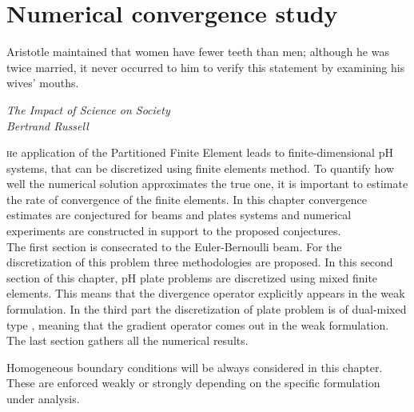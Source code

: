 \chapter{Numerical convergence study}\label{ch:conv}

\epigraph{Aristotle maintained that women have fewer teeth than men; although he was twice married, it never occurred to him to verify this statement by examining his wives' mouths.}{\textit{The Impact of Science on Society \\ Bertrand Russell}}

\minitoc

\lettrine{\color{theme}{T}}he application of the Partitioned Finite Element leads to finite-dimensional pH systems, that can be discretized using finite elements method. To quantify how well the numerical solution approximates the true one, it is important to estimate the rate of convergence of the finite elements. In this chapter convergence estimates are conjectured for beams and plates systems and numerical experiments are constructed in support to the proposed conjectures. \\

The first section is consecrated to the Euler-Bernoulli beam. For the discretization of this problem three methodologies are proposed. In this second section of this chapter, pH plate problems are discretized using mixed finite elements. This means that the divergence operator explicitly appears in the weak formulation.  In the third part the discretization of plate problem is of dual-mixed type \cite{arnold1990intro}, meaning that the gradient operator comes out in the weak formulation. The last section gathers all the numerical results. \\

\begin{remark}
Homogeneous boundary conditions will be always considered in this chapter. These are enforced weakly or strongly depending on the specific formulation under analysis.
\end{remark}


